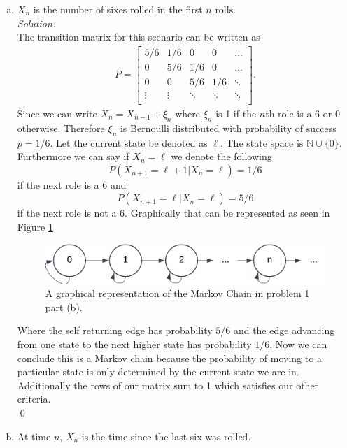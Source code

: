 \documentclass[10pt]{amsart}
\begin{document}
\begin{enumerate}[(a)]
\item $X_n$ is the number of sixes rolled in the first $n$ rolls. \\

\noindent
\textit{Solution:} \\
The transition matrix for this scenario can be written as
\begin{align*}
P =
\begin{bmatrix}
5/6 & 1/6 & 0 & 0 & \dots \\
0 & 5/6 & 1/6 & 0 & \dots \\
0 & 0 & 5/6 & 1/6 & \ddots\\
\vdots & \vdots & \ddots & \ddots & \ddots\\
\end{bmatrix}.
\end{align*}
Since we can write $X_n = X_{n - 1} + \xi_n$ where $\xi_n$ is 1 if the $n$th role is a 6 or 0 otherwise.
Therefore $\xi_n$ is Bernoulli distributed with probability of success $p = 1/6$.
Let the current state be denoted as $\ell$.
The state space is $\mathbb N \cup \{0\}$.
Furthermore we can say if $X_n = \ell$ we denote the following
$$
P(X_{n + 1} = \ell + 1 | X_n = \ell) = 1 / 6
$$
if the next role is a 6 and
$$
P(X_{n + 1} = \ell | X_n = \ell) = 5 / 6
$$
if the next role is not a 6.
Graphically that can be represented as seen in Figure \ref{fig:f2}
\begin{figure}[h]
	\centering
	\includegraphics[scale=0.5]{one_part_b_markov_graph.png}
	\caption{
		A graphical representation of the Markov Chain in problem 1 part (b).
	}\label{fig:f2}
\end{figure}
Where the self returning edge has probability $5/6$ and the edge advancing from one state to the next higher state has probability $1/6$.
Now we can conclude this is a Markov chain because the probability of moving to a particular state is only determined by the current state we are in.
Additionally the rows of our matrix sum to 1 which satisfies our other criteria. \\
\qed \\


\item At time $n$, $X_n$ is the time since the last six was rolled. \\


\end{enumerate}
\end{document}

